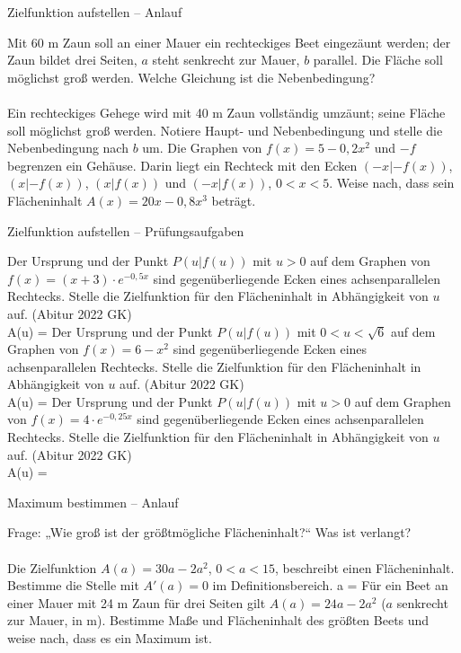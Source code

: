 \begin{aufgabe}{Zielfunktion aufstellen – Anlauf}
\begin{teile}
\teil Mit 60 m Zaun soll an einer Mauer ein rechteckiges Beet eingezäunt werden; der Zaun bildet drei Seiten, $a$ steht senkrecht zur Mauer, $b$ parallel. Die Fläche soll möglichst groß werden. Welche Gleichung ist die Nebenbedingung?  \\  \\ 
\teil Ein rechteckiges Gehege wird mit 40 m Zaun vollständig umzäunt; seine Fläche soll möglichst groß werden. Notiere Haupt- und Nebenbedingung und stelle die Nebenbedingung nach $b$ um.
\teil Die Graphen von $f(x) = 5 - 0{,}2x^2$ und $-f$ begrenzen ein Gehäuse. Darin liegt ein Rechteck mit den Ecken $(-x | -f(x))$, $(x | -f(x))$, $(x | f(x))$ und $(-x | f(x))$, $0 < x < 5$. Weise nach, dass sein Flächeninhalt $A(x) = 20x - 0{,}8x^3$ beträgt.
\end{teile}
\end{aufgabe}

\begin{aufgabe}{Zielfunktion aufstellen – Prüfungsaufgaben}
\begin{teile}
\teil Der Ursprung und der Punkt $P(u | f(u))$ mit $u > 0$ auf dem Graphen von $f(x) = (x + 3) \cdot e^{-0{,}5x}$ sind gegenüberliegende Ecken eines achsenparallelen Rechtecks. Stelle die Zielfunktion für den Flächeninhalt in Abhängigkeit von $u$ auf. \hfill (Abitur 2022 GK) \\ A(u) = \leerfeld
\teil Der Ursprung und der Punkt $P(u | f(u))$ mit $0 < u < \sqrt{6}$ auf dem Graphen von $f(x) = 6 - x^2$ sind gegenüberliegende Ecken eines achsenparallelen Rechtecks. Stelle die Zielfunktion für den Flächeninhalt in Abhängigkeit von $u$ auf. \hfill (Abitur 2022 GK) \\ A(u) = \leerfeld
\teil Der Ursprung und der Punkt $P(u | f(u))$ mit $u > 0$ auf dem Graphen von $f(x) = 4 \cdot e^{-0{,}25x}$ sind gegenüberliegende Ecken eines achsenparallelen Rechtecks. Stelle die Zielfunktion für den Flächeninhalt in Abhängigkeit von $u$ auf. \hfill (Abitur 2022 GK) \\ A(u) = \leerfeld
\end{teile}
\end{aufgabe}

\begin{aufgabe}{Maximum bestimmen – Anlauf}
\begin{teile}
\teil Frage: „Wie groß ist der größtmögliche Flächeninhalt?“ Was ist verlangt?  \\  \\ 
\teil Die Zielfunktion $A(a) = 30a - 2a^2$, $0 < a < 15$, beschreibt einen Flächeninhalt. Bestimme die Stelle mit $A'(a) = 0$ im Definitionsbereich. a = \leerfeld
\teil Für ein Beet an einer Mauer mit 24 m Zaun für drei Seiten gilt $A(a) = 24a - 2a^2$ ($a$ senkrecht zur Mauer, in m). Bestimme Maße und Flächeninhalt des größten Beets und weise nach, dass es ein Maximum ist.
\end{teile}
\end{aufgabe}

